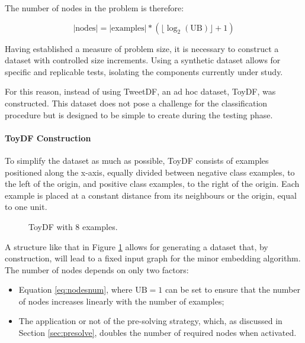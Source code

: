 The number of nodes in the problem is therefore:

\begin{equation}\label{eq:nodesnum}
	|\text{nodes}| = |\text{examples}|*(\lfloor\log_2(\text{UB})\rfloor + 1)
\end{equation}

Having established a measure of problem size, it is necessary to construct a dataset with controlled size increments. 
Using a synthetic dataset allows for specific and replicable tests, isolating the components currently under study.

For this reason, instead of using TweetDF, an ad hoc dataset, ToyDF, was constructed. 
This dataset does not pose a challenge for the classification procedure but is designed to be simple to create during the testing phase.

\paragraph{ToyDF Construction} To simplify the dataset as much as possible, ToyDF consists of examples positioned along the x-axis, equally divided between negative class examples, to the left of the origin, and positive class examples, to the right of the origin. 
Each example is placed at a constant distance from its neighbours or the origin, equal to one unit.

\begin{figure}[H]
    \centering
    \caption{ToyDF with 8 examples.}
    \label{fig:toydf}
\end{figure}

A structure like that in Figure \ref{fig:toydf} allows for generating a dataset that, by construction, will lead to a fixed input graph for the minor embedding algorithm. 
The number of nodes depends on only two factors:

\begin{itemize} 
	\item Equation \ref{eq:nodesnum}, where $\text{UB} = 1$ can be set to ensure that the number of nodes increases linearly with the number of examples; 
	\item The application or not of the pre-solving strategy, which, as discussed in Section \ref{sec:presolve}, doubles the number of required nodes when activated. 
\end{itemize}

